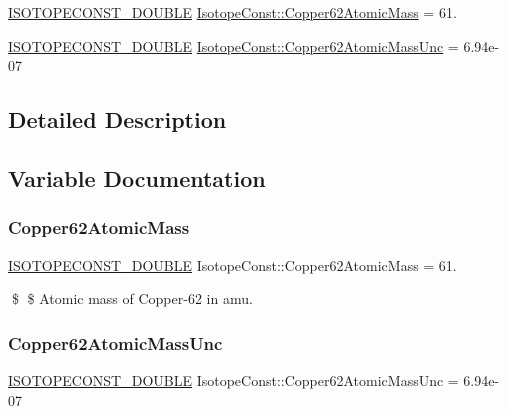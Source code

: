 \begin{DoxyCompactItemize}
\item 
\mbox{\hyperlink{group___isotope_const-_macros_ga8f45a7272ce02c0b4c65c44636ed719a}{I\+S\+O\+T\+O\+P\+E\+C\+O\+N\+S\+T\+\_\+\+D\+O\+U\+B\+LE}} \mbox{\hyperlink{group___isotope_const-_copper-_cu62_gaf7c2902efed258bbf07a44352c470e5c}{Isotope\+Const\+::\+Copper62\+Atomic\+Mass}} = 61.
\item 
\mbox{\hyperlink{group___isotope_const-_macros_ga8f45a7272ce02c0b4c65c44636ed719a}{I\+S\+O\+T\+O\+P\+E\+C\+O\+N\+S\+T\+\_\+\+D\+O\+U\+B\+LE}} \mbox{\hyperlink{group___isotope_const-_copper-_cu62_ga8a34a41c3c2e130bbd1aa89cc250761e}{Isotope\+Const\+::\+Copper62\+Atomic\+Mass\+Unc}} = 6.\+94e-\/07
\end{DoxyCompactItemize}


\subsection{Detailed Description}


\subsection{Variable Documentation}
\mbox{\label{group___isotope_const-_copper-_cu62_gaf7c2902efed258bbf07a44352c470e5c}} 
\subsubsection{\texorpdfstring{Copper62\+Atomic\+Mass}{Copper62AtomicMass}}
{\footnotesize\ttfamily \mbox{\hyperlink{group___isotope_const-_macros_ga8f45a7272ce02c0b4c65c44636ed719a}{I\+S\+O\+T\+O\+P\+E\+C\+O\+N\+S\+T\+\_\+\+D\+O\+U\+B\+LE}} Isotope\+Const\+::\+Copper62\+Atomic\+Mass = 61.}

\$ \$ Atomic mass of Copper-\/62 in amu. \mbox{\label{group___isotope_const-_copper-_cu62_ga8a34a41c3c2e130bbd1aa89cc250761e}} 
\subsubsection{\texorpdfstring{Copper62\+Atomic\+Mass\+Unc}{Copper62AtomicMassUnc}}
{\footnotesize\ttfamily \mbox{\hyperlink{group___isotope_const-_macros_ga8f45a7272ce02c0b4c65c44636ed719a}{I\+S\+O\+T\+O\+P\+E\+C\+O\+N\+S\+T\+\_\+\+D\+O\+U\+B\+LE}} Isotope\+Const\+::\+Copper62\+Atomic\+Mass\+Unc = 6.\+94e-\/07}

